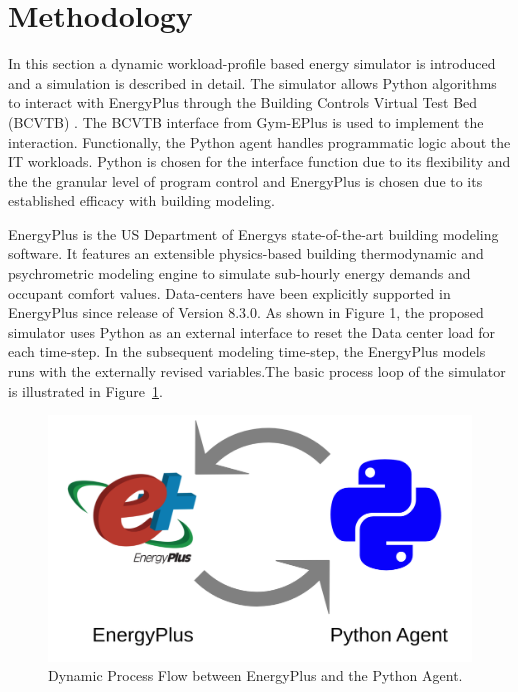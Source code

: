 \section*{Methodology}

In this section a dynamic workload-profile based energy simulator is introduced and a simulation is described in detail. The simulator allows Python algorithms to interact with EnergyPlus through the Building Controls Virtual Test Bed (BCVTB) \citep{wetter16}. The BCVTB interface from Gym-EPlus \citep{zhang19} is used to implement the interaction. Functionally, the Python agent handles programmatic logic about the IT workloads. Python is chosen for the interface function due to its flexibility and the the granular level of program control and EnergyPlus is chosen due to it\textsc{}s established efficacy with building modeling.

EnergyPlus is the US Department of Energy\textsc{}s state-of-the-art building modeling software. It features an extensible physics-based building thermodynamic and psychrometric modeling engine to simulate sub-hourly energy demands and occupant comfort values. Data-centers have been explicitly supported in EnergyPlus since release of Version 8.3.0. As shown in Figure 1, the proposed simulator uses Python as an external interface to reset the Data center load for each time-step. In the subsequent modeling time-step, the EnergyPlus models runs with the externally revised variables.The basic process loop of the simulator is illustrated in Figure~\ref{fig:dyna-bem}. 

\begin{figure}
\centering
\includegraphics[scale=.10]{img/agent_bem.png}
\caption{Dynamic Process Flow between EnergyPlus and the Python Agent.}
\label{fig:dyna-bem}
\end{figure}

